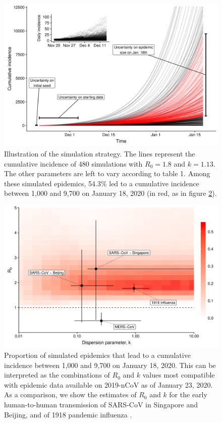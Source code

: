 \documentclass{article}
\begin{document}
\begin{figure}[t]
	\centering
	\includegraphics[width=.95\linewidth]{../figure/fig_traj.png}
	\caption{Illustration of the simulation strategy. The lines represent the cumulative incidence of 480 simulations with $R_0=1.8$ and $k=1.13$. The other parameters are left to vary according to table 1. Among these simulated epidemics, 54.3\% led to a cumulative incidence between 1,000 and 9,700 on January 18, 2020 (in red, as in figure \ref{fig:fig_comb}).}
	\label{fig:fig_traj}
\end{figure}


\begin{figure}[t]
	\centering
	\includegraphics[width=.95\linewidth]{../figure/fig_comb.png}
	\caption{Proportion of simulated epidemics that lead to a cumulative incidence between 1,000 and 9,700 on January 18, 2020. This can be interpreted as the combinations of $R_0$ and $k$ values most compatible with epidemic data available on 2019-nCoV as of January 23, 2020. As a comparison, we show the estimates of $R_0$ and $k$ for the early human-to-human transmission of SARS-CoV in Singapore and Beijing, and of 1918 pandemic influenza \cite{Lloyd-Smith:2005,Fraser:2011,Kucharski:2015b}.
	}
	\label{fig:fig_comb}
\end{figure}
\end{document}

